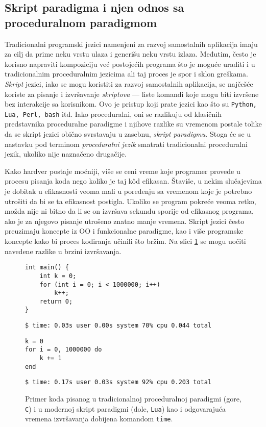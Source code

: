 \subsection{Skript paradigma i njen odnos sa proceduralnom paradigmom}
\label{subsec:Languages}

Tradicionalni programski jezici namenjeni za razvoj samostalnih aplikacija imaju za cilj da prime neku vrstu ulaza i generišu neku vrstu izlaza. Međutim, često je korisno napraviti kompoziciju već postojećih programa što je moguće uraditi i u tradicionalnim proceduralnim jezicima ali taj proces je spor i sklon greškama. \emph{Skript} jezici, iako se mogu koristiti za razvoj samostalnih aplikacija, se najčešće koriste za pisanje i izvršavanje \emph{skriptova} --- liste komandi koje mogu biti izvršene bez interakcije sa korisnikom. Ovo je pristup koji prate jezici kao što su \texttt{Python, Lua, Perl, bash} itd. Iako proceduralni, oni se razlikuju od klasičnih predstavnika proceduralne paradigme i njihove razlike su vremenom postale tolike da se skript jezici obično svrstavaju u zasebnu, \emph{skript paradigmu}. Stoga će se u nastavku pod terminom \emph{proceduralni jezik} smatrati tradicionalni proceduralni jezik, ukoliko nije naznačeno drugačije.

Kako hardver postaje moćniji, više se ceni vreme koje programer provede u procesu pisanja koda nego koliko je taj k\^od efikasan. Štaviše, u nekim slučajevima je dobitak u efikasnosti veoma mali u poređenju sa vremenom koje je potrebno utrošiti da bi se ta efikasnost postigla. Ukoliko se program pokreće veoma retko, možda nije ni bitno da li se on izvršava sekundu sporije od efikasnog programa, ako je za njegovo pisanje utrošeno znatno manje vremena. Skript jezici često preuzimaju koncepte iz OO i funkcionalne paradigme, kao i više programske koncepte kako bi proces kodiranja učinili što bržim. Na slici \ref{fig:LanguagesDiff} se mogu uočiti navedene razlike u brzini izvršavanja.

\begin{figure}[h!]
\begin{lstlisting}
int main() {
    int k = 0;
    for (int i = 0; i < 1000000; i++)
        k++;
    return 0;
}
\end{lstlisting}
\begin{lstlisting}[language={}]
$ time: 0.03s user 0.00s system 70% cpu 0.044 total
\end{lstlisting}
\begin{lstlisting}
k = 0
for i = 0, 1000000 do 
    k += 1 
end
\end{lstlisting}
\begin{lstlisting}[language={}]
$ time: 0.17s user 0.03s system 92% cpu 0.203 total
\end{lstlisting}
\caption{Primer koda pisanog u tradicionalnoj proceduralnoj paradigmi (gore, \texttt{C}) i u modernoj skript paradigmi (dole, \texttt{Lua}) kao i odgovarajuća vremena izvršavanja dobijena komandom \texttt{time}.}
\label{fig:LanguagesDiff}
\end{figure}

